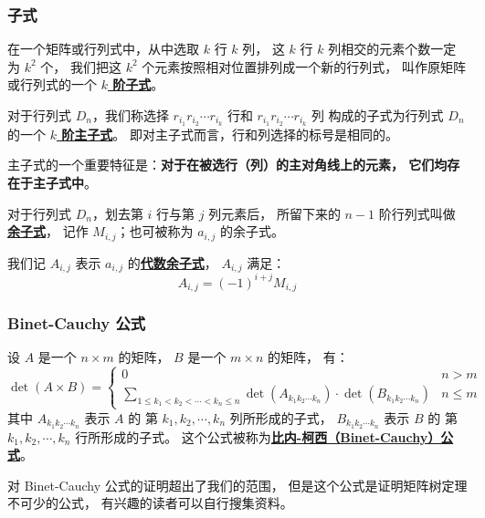 \documentclass[UTF8]{article}
\newcommand \subsubsubsection [2][4mm]
{
	\vspace{#1}
	{\leftline{\heiti #2}}
	\vspace{2mm}
}
\begin{document}
	\subsubsection{子式}

	在一个矩阵或行列式中，从中选取 $k$ 行 $k$ 列，
	这 $k$ 行 $k$ 列相交的元素个数一定为 $k^2$ 个，
	我们把这 $k^2$ 个元素按照相对位置排列成一个新的行列式，
	叫作原矩阵或行列式的一个 \textbf{\uline{$k$ 阶子式}}。

	\subsubsubsection{主子式}

	对于行列式 $D_n$，我们称选择
	$r_{i_1} r_{i_2} \cdots r_{i_k}$ 行和
	$r_{i_1} r_{i_2} \cdots r_{i_k}$ 列
	构成的子式为行列式 $D_n$ 的一个 \textbf{\uline{$k$ 阶主子式}}。
	即对主子式而言，行和列选择的标号是相同的。

	主子式的一个重要特征是：\textbf{对于在被选行（列）的主对角线上的元素，
	它们均存在于主子式中}。

	\subsubsubsection{余子式}

	对于行列式 $D_n$，划去第 $i$ 行与第 $j$ 列元素后，
	所留下来的 $n - 1$ 阶行列式叫做\textbf{\uline{余子式}}，
	记作 $M_{i, j}$；也可被称为 $a_{i, j}$ 的余子式。

	\subsubsubsection{代数余子式}

	我们记 $A_{i, j}$ 表示 $a_{i, j}$ 的\textbf{\uline{代数余子式}}，
	$A_{i, j}$ 满足：
	$$
	A_{i, j} = (-1)^{i + j}M_{i, j}
	$$

	\subsubsection{Binet-Cauchy 公式}

	设 $A$ 是一个 $n \times m$ 的矩阵，
	$B$ 是一个 $m \times n$ 的矩阵，
	有：
	\begin{equation*}
		\det(A \times B) =
		\begin{cases}
			0 & n > m
			\\
			\sum_{1 \le k_1 < k_2 < \cdots < k_n \le n}
			\det(A_{k_1 k_2 \cdots k_n}) \cdot
			\det(B_{k_1 k_2 \cdots k_n})
			& n \le m
		\end{cases}
	\end{equation*}
	其中 $A_{k_1 k_2 \cdots k_n}$ 表示 $A$ 的
	第 $k_1, k_2, \cdots, k_n$ 列所形成的子式，
	$B_{k_1 k_2 \cdots k_n}$ 表示 $B$ 的
	第 $k_1, k_2, \cdots, k_n$ 行所形成的子式。
	这个公式被称为\textbf{\uline{比内-柯西（Binet-Cauchy）公式}}。

	对 Binet-Cauchy 公式的证明超出了我们的范围，
	但是这个公式是证明矩阵树定理不可少的公式，
	有兴趣的读者可以自行搜集资料。
\end{document}
